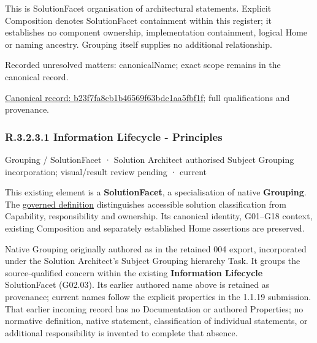 This is SolutionFacet organisation of architectural statements. Explicit Composition denotes SolutionFacet containment within this register; it establishes no component ownership, implementation containment, logical Home or naming ancestry. Grouping itself supplies no additional relationship.


{\small Recorded unresolved matters: canonicalName; exact scope remains in the canonical record.}\par
{\footnotesize \href{../../../../../../../continuum/grouping/b23f7fa8cb1b46569f63bde1aa5fbf1f.md}{Canonical record: b23f7fa8cb1b46569f63bde1aa5fbf1f}; full qualifications and provenance.}\par
\subsubsection*{R.3.2.3.1 Information Lifecycle - Principles}
\label{navigation:R.3.2.3.1}

\label{element:f14ca9b3213d4c3db3c5d479b4cc938e}
{\small Grouping / SolutionFacet · Solution Architect authorised Subject Grouping incorporation; visual/result review pending · current}\par

This existing element is a \textbf{SolutionFacet}, a specialisation of native
\textbf{Grouping}. The \href{\detokenize{../../../../../../../governance/continuum-representation.md#solutionfacet-classification--1119-candidate}}{governed definition}
distinguishes accessible solution classification from Capability, responsibility
and ownership. Its canonical identity, G01–G18 context, existing Composition
and separately established Home assertions are preserved.



Native Grouping originally authored as \texttt{} in the retained 004 export,
incorporated under the Solution Architect's Subject Grouping hierarchy Task.
It groups the source-qualified \texttt{} concern within
the existing \textbf{Information Lifecycle} SolutionFacet (G02.03). Its earlier authored name above is retained as provenance; current names
follow the explicit properties in the 1.1.19 submission.
That earlier incoming record has no Documentation or authored Properties; no normative
definition, native statement, classification of individual statements, or
additional responsibility is invented to complete that absence.



